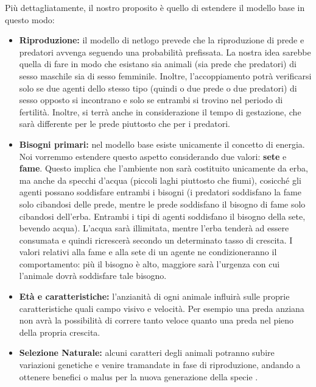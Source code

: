 \documentclass{article}
\begin{document}
Più dettagliatamente, il nostro proposito è quello di estendere il modello base in questo modo: 
\begin{itemize}
    \item \textbf{Riproduzione:} il modello di netlogo prevede che la riproduzione di prede e predatori avvenga seguendo una probabilità prefissata. La nostra idea sarebbe quella di fare in modo che esistano sia animali (sia prede che predatori) di sesso maschile sia di sesso femminile. Inoltre, l'accoppiamento potrà verificarsi solo se due agenti dello stesso tipo (quindi o due prede o due predatori) di sesso opposto si incontrano e solo se entrambi si trovino nel periodo di fertilità. Inoltre, si terrà anche in considerazione il tempo di gestazione, che sarà differente per le prede piuttosto che per i predatori. 
    \item \textbf{Bisogni primari:} nel modello base esiste unicamente il concetto di energia. Noi vorremmo estendere questo aspetto considerando due valori: \textbf{sete} e \textbf{fame}. Questo implica che l'ambiente non sarà costituito unicamente da erba, ma anche da specchi d'acqua (piccoli laghi piuttosto che fiumi), cosicché gli agenti possano soddisfare entrambi i bisogni (i predatori soddisfano la fame solo cibandosi delle prede, mentre le prede soddisfano il bisogno di fame solo cibandosi dell'erba. Entrambi i tipi di agenti soddisfano il bisogno della sete, bevendo acqua). L'acqua sarà illimitata, mentre l'erba tenderà ad essere consumata e quindi ricrescerà secondo un determinato tasso di crescita. I valori relativi alla fame e alla sete di un agente ne condizioneranno il comportamento: più il bisogno è alto, maggiore sarà l'urgenza con cui l'animale dovrà soddisfare tale bisogno. 
    \item \textbf{Età e caratteristiche:} l'anzianità di ogni animale influirà sulle proprie caratteristiche quali campo visivo e velocità. Per esempio una preda anziana non avrà la possibilità di correre tanto veloce quanto una preda nel pieno della propria crescita. 
    \item \textbf{Selezione Naturale:} alcuni caratteri degli animali potranno subire variazioni genetiche e venire tramandate in fase di riproduzione, andando a ottenere benefici o malus per la nuova generazione della specie \cite{YTVideo2}.
\end{itemize}
\end{document}

